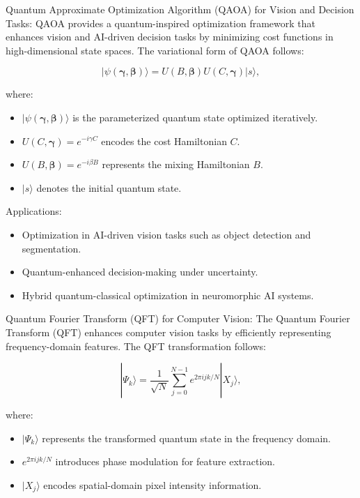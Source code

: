 \pa Quantum Approximate Optimization Algorithm (QAOA) for Vision and Decision Tasks: QAOA provides a quantum-inspired optimization framework that enhances vision and AI-driven decision tasks by minimizing cost functions in high-dimensional state spaces. The variational form of QAOA follows:

\begin{equation}
|\psi(\boldsymbol{\gamma}, \boldsymbol{\beta})\rangle = U(B, \boldsymbol{\beta}) U(C, \boldsymbol{\gamma}) |s\rangle,
\end{equation}

where:
\begin{itemize}
    \item $|\psi(\boldsymbol{\gamma}, \boldsymbol{\beta})\rangle$ is the parameterized quantum state optimized iteratively.
    \item $U(C, \boldsymbol{\gamma}) = e^{-i \gamma C}$ encodes the cost Hamiltonian $C$.
    \item $U(B, \boldsymbol{\beta}) = e^{-i \beta B}$ represents the mixing Hamiltonian $B$.
    \item $|s\rangle$ denotes the initial quantum state.
\end{itemize}

Applications:
\begin{itemize}
    \item Optimization in AI-driven vision tasks such as object detection and segmentation.
    \item Quantum-enhanced decision-making under uncertainty.
    \item Hybrid quantum-classical optimization in neuromorphic AI systems.
\end{itemize}

\pa Quantum Fourier Transform (QFT) for Computer Vision: The Quantum Fourier Transform (QFT) enhances computer vision tasks by efficiently representing frequency-domain features. The QFT transformation follows:

\begin{equation}
|\Psi_k\rangle = \frac{1}{\sqrt{N}} \sum_{j=0}^{N-1} e^{2\pi i jk / N} |X_j\rangle,
\end{equation}

where:
\begin{itemize}
    \item $|\Psi_k\rangle$ represents the transformed quantum state in the frequency domain.
    \item $e^{2\pi i jk / N}$ introduces phase modulation for feature extraction.
    \item $|X_j\rangle$ encodes spatial-domain pixel intensity information.
\end{itemize}

